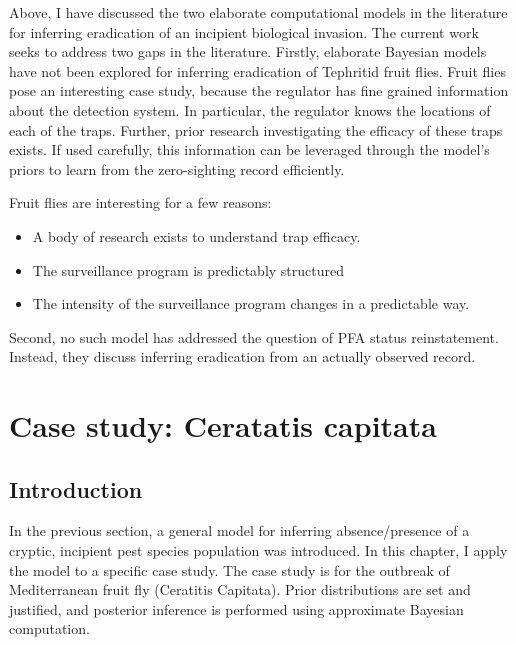 \documentclass[
]{book}
\providecommand{\tightlist}{%
  \setlength{\itemsep}{0pt}\setlength{\parskip}{0pt}}
\begin{document}
Above, I have discussed the two elaborate computational models in the literature for inferring eradication of an incipient biological invasion. The current work seeks to address two gaps in the literature. Firstly, elaborate Bayesian models have not been explored for inferring eradication of Tephritid fruit flies. Fruit flies pose an interesting case study, because the regulator has fine grained information about the detection system. In particular, the regulator knows the locations of each of the traps. Further, prior research investigating the efficacy of these traps exists. If used carefully, this information can be leveraged through the model's priors to learn from the zero-sighting record efficiently.

Fruit flies are interesting for a few reasons:

\begin{itemize}
\tightlist
\item
  A body of research exists to understand trap efficacy.
\item
  The surveillance program is predictably structured
\item
  The intensity of the surveillance program changes in a predictable way.
\end{itemize}

Second, no such model has addressed the question of PFA status reinstatement. Instead, they discuss inferring eradication from an actually observed record.

\hypertarget{case-study-ceratatis-capitata}{%
\chapter{Case study: Ceratatis capitata}\label{case-study-ceratatis-capitata}}

\hypertarget{introduction-2}{%
\section{Introduction}\label{introduction-2}}

In the previous section, a general model for inferring absence/presence of a cryptic, incipient pest species population was introduced. In this chapter, I apply the model to a specific case study. The case study is for the outbreak of Mediterranean fruit fly (Ceratitis Capitata). Prior distributions are set and justified, and posterior inference is performed using approximate Bayesian computation.
\end{document}
